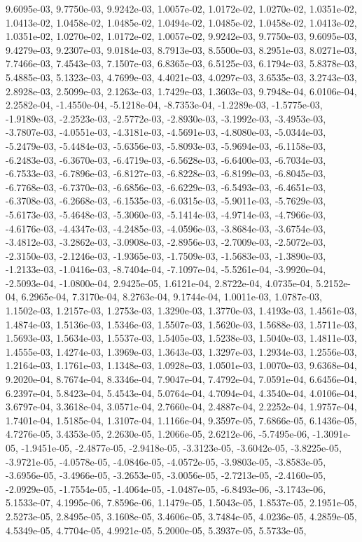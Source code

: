 \documentclass[12pt,fleqn]{article}
\begin{document}
\begin{enumerate}
9.6095e-03,  9.7750e-03,  9.9242e-03,  1.0057e-02,  1.0172e-02,  1.0270e-02,  1.0351e-02,  1.0413e-02,  1.0458e-02,  1.0485e-02,  1.0494e-02,  1.0485e-02,  1.0458e-02,  1.0413e-02,  1.0351e-02,  1.0270e-02,  1.0172e-02,  1.0057e-02,  9.9242e-03,  9.7750e-03,  9.6095e-03,  9.4279e-03,  9.2307e-03,  9.0184e-03,  8.7913e-03,  8.5500e-03,  8.2951e-03,  8.0271e-03,  7.7466e-03,  7.4543e-03,  7.1507e-03,  6.8365e-03,  6.5125e-03,  6.1794e-03,  5.8378e-03,  5.4885e-03,  5.1323e-03,  4.7699e-03,  4.4021e-03,  4.0297e-03,  3.6535e-03,  3.2743e-03,  2.8928e-03,  2.5099e-03,  2.1263e-03,  1.7429e-03,  1.3603e-03,  9.7948e-04,  6.0106e-04,  2.2582e-04, -1.4550e-04, -5.1218e-04, -8.7353e-04, -1.2289e-03, -1.5775e-03, -1.9189e-03,  -2.2523e-03, -2.5772e-03, -2.8930e-03, -3.1992e-03, -3.4953e-03, -3.7807e-03, -4.0551e-03, -4.3181e-03,  -4.5691e-03, -4.8080e-03, -5.0344e-03, -5.2479e-03, -5.4484e-03, -5.6356e-03, -5.8093e-03, -5.9694e-03,  -6.1158e-03, -6.2483e-03, -6.3670e-03, -6.4719e-03, -6.5628e-03, -6.6400e-03, -6.7034e-03, -6.7533e-03,  -6.7896e-03, -6.8127e-03, -6.8228e-03, -6.8199e-03, -6.8045e-03, -6.7768e-03, -6.7370e-03, -6.6856e-03,  -6.6229e-03, -6.5493e-03, -6.4651e-03, -6.3708e-03, -6.2668e-03, -6.1535e-03, -6.0315e-03, -5.9011e-03,  -5.7629e-03, -5.6173e-03, -5.4648e-03, -5.3060e-03, -5.1414e-03, -4.9714e-03, -4.7966e-03, -4.6176e-03,  -4.4347e-03, -4.2485e-03, -4.0596e-03, -3.8684e-03, -3.6754e-03, -3.4812e-03, -3.2862e-03, -3.0908e-03,  -2.8956e-03, -2.7009e-03, -2.5072e-03, -2.3150e-03, -2.1246e-03, -1.9365e-03, -1.7509e-03, -1.5683e-03,  -1.3890e-03, -1.2133e-03, -1.0416e-03, -8.7404e-04, -7.1097e-04, -5.5261e-04, -3.9920e-04, -2.5093e-04,  -1.0800e-04,  2.9425e-05,  1.6121e-04,  2.8722e-04,  4.0735e-04,  5.2152e-04,  6.2965e-04,  7.3170e-04,  8.2763e-04,  9.1744e-04,  1.0011e-03,  1.0787e-03,  1.1502e-03,  1.2157e-03,  1.2753e-03,  1.3290e-03,  1.3770e-03,  1.4193e-03,  1.4561e-03,  1.4874e-03,  1.5136e-03,  1.5346e-03,  1.5507e-03,  1.5620e-03,  1.5688e-03,  1.5711e-03,  1.5693e-03,  1.5634e-03,  1.5537e-03,  1.5405e-03,  1.5238e-03,  1.5040e-03,  1.4811e-03,  1.4555e-03,  1.4274e-03,  1.3969e-03,  1.3643e-03,  1.3297e-03,  1.2934e-03,  1.2556e-03,  1.2164e-03,  1.1761e-03,  1.1348e-03,  1.0928e-03,  1.0501e-03,  1.0070e-03,  9.6368e-04,  9.2020e-04,  8.7674e-04,  8.3346e-04,  7.9047e-04,  7.4792e-04,  7.0591e-04,  6.6456e-04,  6.2397e-04,  5.8423e-04,  5.4543e-04,  5.0764e-04,  4.7094e-04,  4.3540e-04,  4.0106e-04,  3.6797e-04,  3.3618e-04,  3.0571e-04,  2.7660e-04,  2.4887e-04,  2.2252e-04,  1.9757e-04,  1.7401e-04,  1.5185e-04,  1.3107e-04,  1.1166e-04,  9.3597e-05,  7.6866e-05,  6.1436e-05,  4.7276e-05,  3.4353e-05,  2.2630e-05,  1.2066e-05,  2.6212e-06,  -5.7495e-06, -1.3091e-05, -1.9451e-05, -2.4877e-05, -2.9418e-05, -3.3123e-05, -3.6042e-05, -3.8225e-05,  -3.9721e-05, -4.0578e-05, -4.0846e-05, -4.0572e-05, -3.9803e-05, -3.8583e-05, -3.6956e-05, -3.4966e-05,  -3.2653e-05, -3.0056e-05, -2.7213e-05, -2.4160e-05, -2.0929e-05, -1.7554e-05, -1.4064e-05, -1.0487e-05,  -6.8493e-06, -3.1743e-06,  5.1533e-07,  4.1995e-06,  7.8596e-06,  1.1479e-05,  1.5043e-05,  1.8537e-05,  2.1951e-05,  2.5273e-05,  2.8495e-05,  3.1608e-05,  3.4606e-05,  3.7484e-05,  4.0236e-05,  4.2859e-05,  4.5349e-05,  4.7704e-05,  4.9921e-05,  5.2000e-05,  5.3937e-05,  5.5733e-05,  
\end{enumerate}
\end{document}
